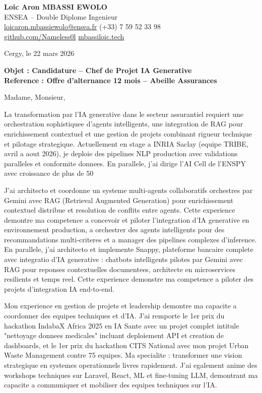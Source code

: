 \documentclass[a4paper,11pt]{article}
\begin{document}
\noindent
\textbf{Loic Aron MBASSI EWOLO} \\
ENSEA -- Double Diplome Ingenieur \\
\href{mailto:loicaron.mbassiewolo@ensea.fr}{loicaron.mbassiewolo@ensea.fr} \quad (+33) 7 59 52 33 98 \\
\href{https://github.com/Nameless0l}{github.com/Nameless0l} \quad \href{https://mbassiloic.tech}{mbassiloic.tech}

\vspace{1em}
\noindent
Cergy, le 22 mars 2026

\vspace{1em}
\noindent
\textbf{Objet : Candidature -- Chef de Projet IA Generative} \\
\textbf{Reference : Offre d'alternance 12 mois -- Abeille Assurances}

\vspace{1.5em}
\noindent Madame, Monsieur,

La transformation par l'IA generative dans le secteur assurantiel requiert une orchestration sophistiquee d'agents intelligents, une integration de RAG pour enrichissement contextuel et une gestion de projets combinant rigueur technique et pilotage strategique. Actuellement en stage a INRIA Saclay (equipe TRIBE, avril a aout 2026), je deploie des pipelines NLP production avec validations paralleles et conformite donnees. En parallele, j'ai dirige l'AI Cell de l'ENSPY avec croissance de plus de 50%

J'ai architecto et coordonne un systeme multi-agents collaboratifs orchestres par Gemini avec RAG (Retrieval Augmented Generation) pour enrichissement contextuel distribue et resolution de conflits entre agents. Cette experience demontre ma competence a concevoir et piloter l'integration d'IA generative en environnement production, a orchestrer des agents intelligents pour des recommandations multi-criteres et a manager des pipelines complexes d'inference. En parallele, j'ai architecto et implemente Snappy, plateforme bancaire complete avec integratio d'IA generative : chatbots intelligents pilotes par Gemini avec RAG pour reponses contextuelles documentees, architecte en microservices resilients et temps reel. Cette experience demonstre ma competence a piloter des projets d'integration IA end-to-end.

Mon experience en gestion de projets et leadership demontre ma capacite a coordonner des equipes techniques et d'IA. J'ai remporte le 1er prix du hackathon IndabaX Africa 2025 en IA Sante avec un projet complet intitule "nettoyage donnees medicales" incluant deploiement API et creation de dashboards, et le 1er prix du hackathon CITS National avec mon projet Urban Waste Management contre 75 equipes. Ma specialite : transformer une vision strategique en systemes operationnels livres rapidement. J'ai egalement anime des workshops techniques sur Laravel, React, ML et fine-tuning LLM, demontrant ma capacite a communiquer et mobiliser des equipes techniques sur l'IA.
\end{document}
